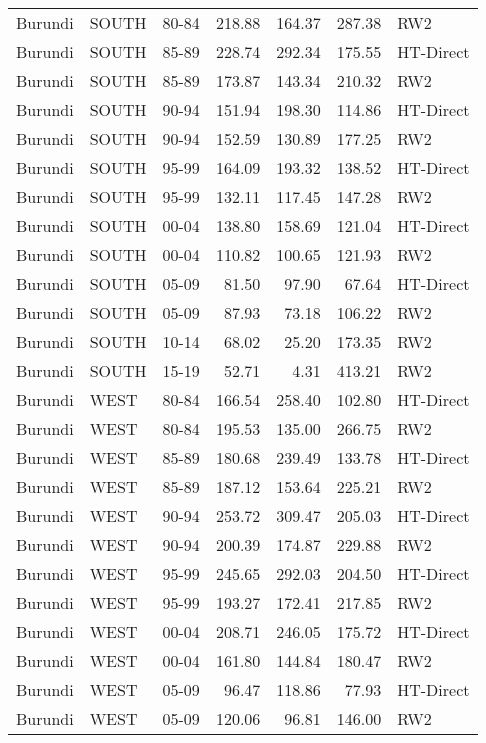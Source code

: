 \begin{longtable}{lllrrrl}
  Burundi & SOUTH & 80-84 & 218.88 & 164.37 & 287.38 & RW2 \\ 
  Burundi & SOUTH & 85-89 & 228.74 & 292.34 & 175.55 & HT-Direct \\ 
  Burundi & SOUTH & 85-89 & 173.87 & 143.34 & 210.32 & RW2 \\ 
  Burundi & SOUTH & 90-94 & 151.94 & 198.30 & 114.86 & HT-Direct \\ 
  Burundi & SOUTH & 90-94 & 152.59 & 130.89 & 177.25 & RW2 \\ 
  Burundi & SOUTH & 95-99 & 164.09 & 193.32 & 138.52 & HT-Direct \\ 
  Burundi & SOUTH & 95-99 & 132.11 & 117.45 & 147.28 & RW2 \\ 
  Burundi & SOUTH & 00-04 & 138.80 & 158.69 & 121.04 & HT-Direct \\ 
  Burundi & SOUTH & 00-04 & 110.82 & 100.65 & 121.93 & RW2 \\ 
  Burundi & SOUTH & 05-09 & 81.50 & 97.90 & 67.64 & HT-Direct \\ 
  Burundi & SOUTH & 05-09 & 87.93 & 73.18 & 106.22 & RW2 \\ 
  Burundi & SOUTH & 10-14 & 68.02 & 25.20 & 173.35 & RW2 \\ 
  Burundi & SOUTH & 15-19 & 52.71 & 4.31 & 413.21 & RW2 \\ 
  Burundi & WEST & 80-84 & 166.54 & 258.40 & 102.80 & HT-Direct \\ 
  Burundi & WEST & 80-84 & 195.53 & 135.00 & 266.75 & RW2 \\ 
  Burundi & WEST & 85-89 & 180.68 & 239.49 & 133.78 & HT-Direct \\ 
  Burundi & WEST & 85-89 & 187.12 & 153.64 & 225.21 & RW2 \\ 
  Burundi & WEST & 90-94 & 253.72 & 309.47 & 205.03 & HT-Direct \\ 
  Burundi & WEST & 90-94 & 200.39 & 174.87 & 229.88 & RW2 \\ 
  Burundi & WEST & 95-99 & 245.65 & 292.03 & 204.50 & HT-Direct \\ 
  Burundi & WEST & 95-99 & 193.27 & 172.41 & 217.85 & RW2 \\ 
  Burundi & WEST & 00-04 & 208.71 & 246.05 & 175.72 & HT-Direct \\ 
  Burundi & WEST & 00-04 & 161.80 & 144.84 & 180.47 & RW2 \\ 
  Burundi & WEST & 05-09 & 96.47 & 118.86 & 77.93 & HT-Direct \\ 
  Burundi & WEST & 05-09 & 120.06 & 96.81 & 146.00 & RW2 \\ 

\end{longtable}
